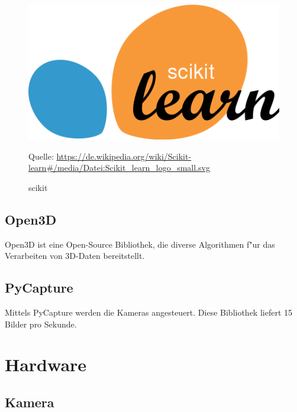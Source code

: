 \begin{figure}[H]
	\includegraphics[scale=0.2]{bilder/scikit}
	\caption[scikit]{scikit}
	\small Quelle: \url{https://de.wikipedia.org/wiki/Scikit-learn#/media/Datei:Scikit_learn_logo_small.svg}
\end{figure}

\subsection{Open3D}
\label{sec:open3d}

Open3D ist eine Open-Source Bibliothek, die diverse Algorithmen f"ur das Verarbeiten von 3D-Daten bereitstellt.

\subsection{PyCapture}
\label{sec:pycapture}

Mittels PyCapture werden die Kameras angesteuert. Diese Bibliothek liefert 15 Bilder pro Sekunde.

\section{Hardware}
\label{sec:hardware}

\subsection{Kamera}
\label{sec:kamera}
